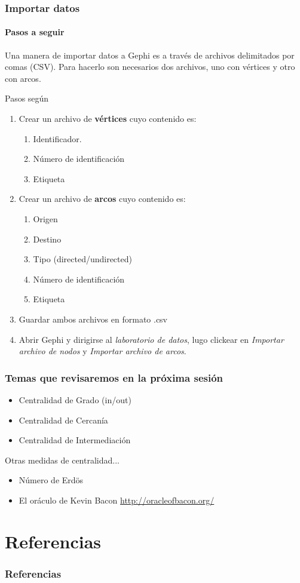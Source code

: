 \documentclass[10pt,draft]{beamer}
\begin{document}
\begin{frame}
\frametitle{Importar datos}
\framesubtitle{Pasos a seguir}

Una manera de importar datos a Gephi es a trav\'es de archivos delimitados por
comas (CSV). Para hacerlo son necesarios dos archivos, uno con v\'ertices y otro
con arcos.

Pasos seg\'un \cite{cherven2013network}

\begin{enumerate}
\item Crear un archivo de {\bf v\'ertices} cuyo contenido es:
  \begin{enumerate}
  \item Identificador.
  \item N\'umero de identificaci\'on
  \item Etiqueta
  \end{enumerate}
\item Crear un archivo de {\bf arcos} cuyo contenido es:
  \begin{enumerate}
  \item Origen
  \item Destino
  \item Tipo (directed/undirected)
  \item N\'umero de identificaci\'on
  \item Etiqueta
  \end{enumerate}
\item Guardar ambos archivos en formato .csv
\item Abrir Gephi y dirigirse al \emph{laboratorio de datos}, lugo clickear en
\emph{Importar archivo de nodos} y \emph{Importar archivo de arcos}.
\end{enumerate}
\end{frame}

\begin{frame}
\frametitle{Temas que revisaremos en la pr\'oxima sesi\'on}
\begin{itemize}
\item Centralidad de Grado (in/out)
\item Centralidad de Cercan\'ia
\item Centralidad de Intermediaci\'on
\end{itemize}
Otras medidas de centralidad...
\begin{itemize}
\item N\'umero de Erd{\"o}s 
\item El or\'aculo de Kevin Bacon \url{http://oracleofbacon.org/}
\end{itemize}
\end{frame}

\section{Referencias}
\begin{frame}
\frametitle{Referencias}


\end{frame}
\end{document}

